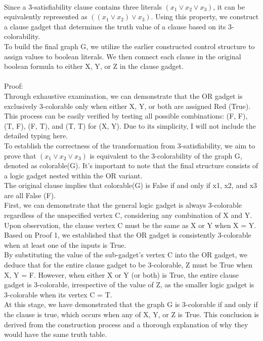 \documentclass[11pt]{article}
\begin{document}
\\Since a 3-satisfiability clause contains three literals $(x_1 \vee x_2 \vee x_3)$, it can be equivalently represented as $((x_1 \vee x_2) \vee x_3)$. Using this property, we construct a clause gadget that determines the truth value of a clause based on its 3-colorability.
\\To build the final graph G, we utilize the earlier constructed control structure to assign values to boolean literals. We then connect each clause in the original boolean formula to either X, Y, or Z in the clause gadget.
\\
\\Proof:
\\Through exhaustive examination, we can demonstrate that the OR gadget is exclusively 3-colorable only when either X, Y, or both are assigned Red (True). This process can be easily verified by testing all possible combinations: (F, F), (T, F), (F, T), and (T, T) for (X, Y). Due to its simplicity, I will not include the detailed typing here.
\\To establish the correctness of the transformation from 3-satisfiability, we aim to prove that $(x_1 \vee x_2 \vee x_3)$ is equivalent to the 3-colorability of the graph G, denoted as colorable(G). It's important to note that the final structure consists of a logic gadget nested within the OR variant.
\\The original clause implies that colorable(G) is False if and only if x1, x2, and x3 are all False (F).
\\First, we can demonstrate that the general logic gadget is always 3-colorable regardless of the unspecified vertex C, considering any combination of X and Y.
\\Upon observation, the clause vertex C must be the same as X or Y when X = Y.
\\Based on Proof 1, we established that the OR gadget is consistently 3-colorable when at least one of the inputs is True.
\\By substituting the value of the sub-gadget's vertex C into the OR gadget, we deduce that for the entire clause gadget to be 3-colorable, Z must be True when X, Y = F. However, when either X or Y (or both) is True, the entire clause gadget is 3-colorable, irrespective of the value of Z, as the smaller logic gadget is 3-colorable when its vertex C = T.
\\At this stage, we have demonstrated that the graph G is 3-colorable if and only if the clause is true, which occurs when any of X, Y, or Z is True. This conclusion is derived from the construction process and a thorough explanation of why they would have the same truth table.
\end{document}
